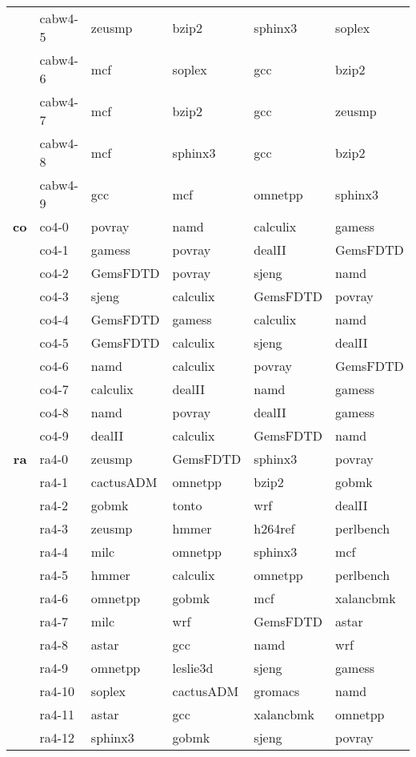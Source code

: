 \begin{table}[ht]
{\begin{tabular}{|r|lllll|}
			 & cabw4-5	 & zeusmp & bzip2 & sphinx3 & soplex \\ 
			 & cabw4-6	 & mcf & soplex & gcc & bzip2 \\ 
			 & cabw4-7	 & mcf & bzip2 & gcc & zeusmp \\ 
			 & cabw4-8	 & mcf & sphinx3 & gcc & bzip2 \\ 
			 & cabw4-9	 & gcc & mcf & omnetpp & sphinx3 \\ 
\textbf{co}	 & co4-0	 & povray & namd & calculix & gamess \\ 
			 & co4-1	 & gamess & povray & dealII & GemsFDTD \\ 
			 & co4-2	 & GemsFDTD & povray & sjeng & namd \\ 
			 & co4-3	 & sjeng & calculix & GemsFDTD & povray \\ 
			 & co4-4	 & GemsFDTD & gamess & calculix & namd \\ 
			 & co4-5	 & GemsFDTD & calculix & sjeng & dealII \\ 
			 & co4-6	 & namd & calculix & povray & GemsFDTD \\ 
			 & co4-7	 & calculix & dealII & namd & gamess \\ 
			 & co4-8	 & namd & povray & dealII & gamess \\ 
			 & co4-9	 & dealII & calculix & GemsFDTD & namd \\ 
\textbf{ra}	 & ra4-0	 & zeusmp & GemsFDTD & sphinx3 & povray \\ 
			 & ra4-1	 & cactusADM & omnetpp & bzip2 & gobmk \\ 
			 & ra4-2	 & gobmk & tonto & wrf & dealII \\ 
			 & ra4-3	 & zeusmp & hmmer & h264ref & perlbench \\ 
			 & ra4-4	 & milc & omnetpp & sphinx3 & mcf \\ 
			 & ra4-5	 & hmmer & calculix & omnetpp & perlbench \\ 
			 & ra4-6	 & omnetpp & gobmk & mcf & xalancbmk \\ 
			 & ra4-7	 & milc & wrf & GemsFDTD & astar \\ 
			 & ra4-8	 & astar & gcc & namd & wrf \\ 
			 & ra4-9	 & omnetpp & leslie3d & sjeng & gamess \\ 
			 & ra4-10	 & soplex & cactusADM & gromacs & namd \\ 
			 & ra4-11	 & astar & gcc & xalancbmk & omnetpp \\ 
			 & ra4-12	 & sphinx3 & gobmk & sjeng & povray \\ 

\end{tabular}}
\end{table}
